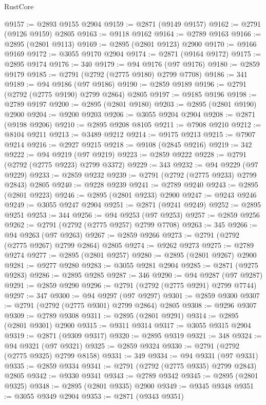 \begin{lexlean}{RustCore}
\begin{coremodule}
@9157 := @2893 @9155 @2904
@9159 := @2871 (@9149 @9157)
@9162 := @2791 (@9126 @9159) @2805
@9163 := @9118 @9162
@9164 := @2789 @9163
@9166 := @2895 (@2801 @9113)
@9169 := @2895 (@2801 @9123) @2900
@9170 := @9166 @9169
@9172 := @3055 @9170 @2904
@9174 := @2871 (@9164 @9172)
@9175 := @2895 @9174
@9176 := 340
@9179 := @94 @9176 (@97 @9176)
@9180 := @2859 @9179
@9185 := @2791 (@2792 (@2775 @9180) @2799 @7708)
@9186 := 341
@9189 := @94 @9186 (@97 @9186)
@9190 := @2859 @9189
@9196 := @2791 (@2792 (@2775 @9190) @2799 @2864) @2805
@9197 := @9185 @9196
@9198 := @2789 @9197
@9200 := @2895 (@2801 @9180)
@9203 := @2895 (@2801 @9190) @2900
@9204 := @9200 @9203
@9206 := @3055 @9204 @2904
@9208 := @2871 (@9198 @9206)
@9210 := @2895 @9208 @8105
@9211 := @7908 @9210
@9212 := @8104 @9211
@9213 := @3489 @9212
@9214 := @9175 @9213
@9215 := @7907 @9214
@9216 := @2927 @9215
@9218 := @9108 (@2845 @9216)
@9219 := 342
@9222 := @94 @9219 (@97 @9219)
@9223 := @2859 @9222
@9228 := @2791 (@2792 (@2775 @9223) @2799 @3372)
@9229 := 343
@9232 := @94 @9229 (@97 @9229)
@9233 := @2859 @9232
@9239 := @2791 (@2792 (@2775 @9233) @2799 @2843) @2805
@9240 := @9228 @9239
@9241 := @2789 @9240
@9243 := @2895 (@2801 @9223)
@9246 := @2895 (@2801 @9233) @2900
@9247 := @9243 @9246
@9249 := @3055 @9247 @2904
@9251 := @2871 (@9241 @9249)
@9252 := @2895 @9251
@9253 := 344
@9256 := @94 @9253 (@97 @9253)
@9257 := @2859 @9256
@9262 := @2791 (@2792 (@2775 @9257) @2799 @7708)
@9263 := 345
@9266 := @94 @9263 (@97 @9263)
@9267 := @2859 @9266
@9273 := @2791 (@2792 (@2775 @9267) @2799 @2864) @2805
@9274 := @9262 @9273
@9275 := @2789 @9274
@9277 := @2895 (@2801 @9257)
@9280 := @2895 (@2801 @9267) @2900
@9281 := @9277 @9280
@9283 := @3055 @9281 @2904
@9285 := @2871 (@9275 @9283)
@9286 := @2895 @9285
@9287 := 346
@9290 := @94 @9287 (@97 @9287)
@9291 := @2859 @9290
@9296 := @2791 (@2792 (@2775 @9291) @2799 @7744)
@9297 := 347
@9300 := @94 @9297 (@97 @9297)
@9301 := @2859 @9300
@9307 := @2791 (@2792 (@2775 @9301) @2799 @2864) @2805
@9308 := @9296 @9307
@9309 := @2789 @9308
@9311 := @2895 (@2801 @9291)
@9314 := @2895 (@2801 @9301) @2900
@9315 := @9311 @9314
@9317 := @3055 @9315 @2904
@9319 := @2871 (@9309 @9317)
@9320 := @2895 @9319
@9321 := 348
@9324 := @94 @9321 (@97 @9321)
@9325 := @2859 @9324
@9330 := @2791 (@2792 (@2775 @9325) @2799 @8158)
@9331 := 349
@9334 := @94 @9331 (@97 @9331)
@9335 := @2859 @9334
@9341 := @2791 (@2792 (@2775 @9335) @2799 @2843) @2805
@9342 := @9330 @9341
@9343 := @2789 @9342
@9345 := @2895 (@2801 @9325)
@9348 := @2895 (@2801 @9335) @2900
@9349 := @9345 @9348
@9351 := @3055 @9349 @2904
@9353 := @2871 (@9343 @9351)

\end{coremodule}
\end{lexlean}
